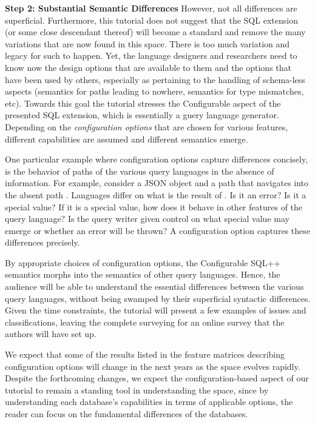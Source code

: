 \smallskip
\noindent \textbf{Step 2: Substantial Semantic Differences} However, not all differences are superficial. Furthermore, this tutorial does not suggest that the SQL extension (or some close descendant thereof) will become a standard and remove the many variations that are now found in this space. There is too much variation and legacy for such to happen. Yet, the language designers and researchers need to know now the design options that are available to them and the options that have been used by others, especially as pertaining to the handling of schema-less aspects (semantics for paths leading to nowhere, semantics for type mismatches, etc). 
Towards this goal the tutorial stresses the Configurable aspect of the presented SQL extension, which is essentially a guery language generator. Depending on the \textit{ configuration options} that are chosen for various features, different capabilities are assumed and different semantics emerge.

One particular example where configuration options capture differences concisely, is the behavior of paths of the various query languages in the absence of information. For example, consider a JSON object  and a path that navigates into the absent path . Languages differ on what is the result of . Is it an error? Is it a special value? If it is a special value, how does it behave in other features of the query language? Is the query writer given control on what special value may emerge or whether an error will be thrown? A configuration option captures these differences precisely. 

By appropriate choices of configuration options, the Configurable SQL++ semantics morphs into the semantics of other query languages. Hence, the audience will be able to understand the essential differences between the various query languages, without being swamped by their superficial syntactic differences. Given the time constraints, the tutorial will present a few examples of issues and classifications, leaving the complete surveying for an online survey that the authors will have set up.  

We expect that some of the results listed in the feature matrices describing configuration options will change in the next years as the space evolves rapidly.
Despite the forthcoming changes, we expect the configuration-based aspect of our tutorial to remain a standing tool in understanding the space, since by understanding each database's capabilities in terms of applicable options, the reader can focus on the fundamental differences of the databases. 

